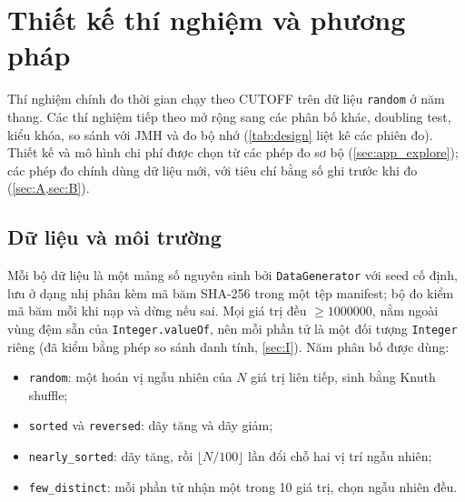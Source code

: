\documentclass[12pt,a4paper]{article}
\begin{document}
\begin{table}[htbp]
\centering\small
\caption{Các nhóm kiểm thử của \texttt{CorrectnessTest} (chạy với \texttt{-ea}).}\label{tab:correctness}

\end{table}

\begin{table}[htbp]
\centering\small
\caption{Kiểm thử đột biến: lỗi được cài có chủ ý và các nhóm kiểm thử (đánh số như \cref{tab:correctness}) phát hiện lỗi.}\label{tab:mutation}

\end{table}


\section{Thiết kế thí nghiệm và phương pháp}\label{sec:4}
Thí nghiệm chính đo thời gian chạy theo CUTOFF trên dữ liệu \texttt{random} ở năm thang. Các thí nghiệm tiếp theo mở rộng sang các phân bố khác, doubling test, kiểu khóa, so sánh với JMH và đo bộ nhớ (\cref{tab:design} liệt kê các phiên đo). Thiết kế và mô hình chi phí được chọn từ các phép đo sơ bộ (\cref{sec:app_explore}); các phép đo chính dùng dữ liệu mới, với tiêu chí bằng số ghi trước khi đo (\cref{sec:A,sec:B}).

\subsection{Dữ liệu và môi trường}\label{sec:4.2}\label{sec:4.11}
Mỗi bộ dữ liệu là một mảng số nguyên sinh bởi \texttt{DataGenerator} với seed cố định, lưu ở dạng nhị phân kèm mã băm SHA-256 trong một tệp manifest; bộ đo kiểm mã băm mỗi khi nạp và dừng nếu sai. Mọi giá trị đều $\ge \num{1000000}$, nằm ngoài vùng đệm sẵn của \texttt{Integer.valueOf}, nên mỗi phần tử là một đối tượng \texttt{Integer} riêng (đã kiểm bằng phép so sánh danh tính, \cref{sec:I}). Năm phân bố được dùng:
\begin{itemize}
\item \texttt{random}: một hoán vị ngẫu nhiên của $N$ giá trị liên tiếp, sinh bằng Knuth shuffle;
\item \texttt{sorted} và \texttt{reversed}: dãy tăng và dãy giảm;
\item \texttt{nearly\_sorted}: dãy tăng, rồi $\lfloor N/100 \rfloor$ lần đổi chỗ hai vị trí ngẫu nhiên;
\item \texttt{few\_distinct}: mỗi phần tử nhận một trong 10 giá trị, chọn ngẫu nhiên đều.
\end{itemize}
\end{document}
